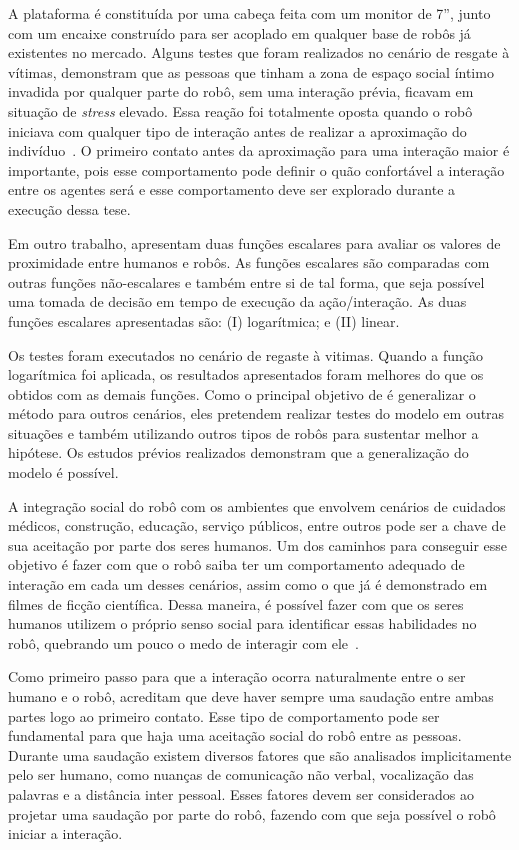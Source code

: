 A plataforma é constituída por uma cabeça feita com um monitor de 7'', junto com um encaixe construído para ser acoplado em qualquer base de robôs já existentes no mercado. Alguns testes que foram realizados no cenário de resgate à vítimas, demonstram que as pessoas que tinham a zona de espaço social íntimo invadida por qualquer parte do robô, sem uma interação prévia, ficavam em situação de \emph{stress} elevado. Essa reação foi totalmente oposta quando o robô iniciava com qualquer tipo de interação antes de realizar a aproximação do indivíduo~\cite{Henkel:2012}. O primeiro contato antes da aproximação para uma interação maior é importante, pois esse comportamento pode definir o quão confortável a interação entre os agentes será e esse comportamento deve ser explorado durante a execução dessa tese.

Em outro trabalho,  apresentam duas funções escalares para avaliar os valores de proximidade entre humanos e robôs. As funções escalares são comparadas com outras funções não-escalares e também entre si de tal forma, que seja possível uma tomada de decisão em tempo de execução da ação/interação. As duas funções escalares apresentadas são: (I) logarítmica; e (II) linear.

Os testes foram executados no cenário de regaste à vitimas. Quando a função logarítmica foi aplicada, os resultados apresentados foram melhores do que os obtidos com as demais funções. Como o principal objetivo de  é generalizar o método para outros cenários, eles pretendem realizar testes do modelo em outras situações e também utilizando outros tipos de robôs para sustentar melhor a hipótese. Os estudos prévios realizados demonstram que a generalização do modelo é possível.

A integração social do robô com os ambientes que envolvem cenários de cuidados médicos, construção, educação, serviço públicos, entre outros pode ser a chave de sua aceitação por parte dos seres humanos. Um dos caminhos para conseguir esse objetivo é fazer com que o robô saiba ter um comportamento adequado de interação em cada um desses cenários, assim como o que já é demonstrado em filmes de ficção científica. Dessa maneira, é possível fazer com que os seres humanos utilizem o próprio senso social para identificar essas habilidades no robô, quebrando um pouco o medo de interagir com ele~\cite{Heenan:2014}.

Como primeiro passo para que a interação ocorra naturalmente entre o ser humano e o robô,  acreditam que deve haver sempre uma saudação entre ambas partes logo ao primeiro contato. Esse tipo de comportamento pode ser fundamental para que haja uma aceitação social do robô entre as pessoas. Durante uma saudação existem diversos fatores que são analisados implicitamente pelo ser humano, como nuanças de comunicação não verbal, vocalização das palavras e a distância inter pessoal. Esses fatores devem ser considerados ao projetar uma saudação por parte do robô, fazendo com que seja possível o robô iniciar a interação.

